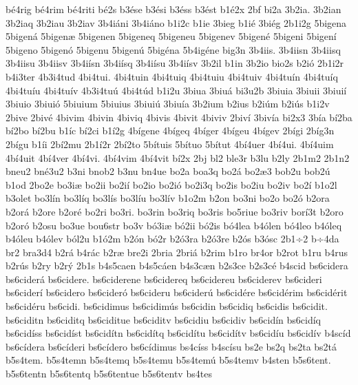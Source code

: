 {b^^e94rig
b^^e94rim
b^^e94riti
b^^e92s
b3^^e9se
b3^^e9si
b3^^e9ss
b3^^e9st
b1^^e92x
2bf
bi2a
3b2ia.
3b2ian
3b2iaq
3b2iau
3b2iav
3b4i^^e1ni
3b4i^^e1no
b1i2c
b1ie
3bieg
b1i^^e9
3bi^^e9g
2b1i2g
5bigena
5bigen^^e1
5bigen^^e6
5bigenen
5bigeneq
5bigeneu
5bigenev
5bigen^^e9
5bigeni
5bigen^^ed
5bigeno
5bigen^^f3
5bigenu
5bigen^^fa
5big^^e9na
5b4ig^^e9ne
big3n
3b4iis.
3b4iisn
3b4iisq
3b4iisu
3b4iisv
3b4i^^edsn
3b4i^^edsq
3b4i^^edsu
3b4i^^edsv
3b2il
b1in
3b2io
bio2s
b2i^^f3
2b1i2r
b4i3ter
4b3i4tud
4bi4tui.
4bi4tuin
4bi4tuiq
4bi4tuiu
4bi4tuiv
4bi4tu^^edn
4bi4tu^^edq
4bi4tu^^edu
4bi4tu^^edv
4b3i4tu^^fa
4bi4t^^fad
b1i2u
3biua
3biu^^e1
bi3u2b
3biuia
3biuii
3biui^^ed
3biuio
3biui^^f3
5biuium
5biuius
3biui^^fa
3biu^^eda
3b2ium
b2ius
b2i^^fam
b2i^^fas
b1i2v
2bive
2biv^^e9
4bivim
4bivin
4biviq
4bivis
4bivit
4biviv
2biv^^ed
3biv^^eda
bi2x3
3b^^eda
b^^ed2ba
b^^ed2bo
b^^ed2bu
b1^^edc
b^^ed2ci
b1^^ed2g
4b^^edgene
4b^^edgeq
4b^^edger
4b^^edgeu
4b^^edgev
2b^^edgi
2b^^edg3n
2b^^edgu
b1^^edi
2b^^ed2mu
2b1^^ed2r
2b^^ed2to
5b^^edtuis
5b^^edtuo
5b^^edtut
4b^^ed4uer
4b^^ed4ui.
4b^^ed4uim
4b^^ed4uit
4b^^ed4ver
4b^^ed4vi.
4b^^ed4vim
4b^^ed4vit
b^^ed2x
2bj
bl2
ble3r
b3lu
b2ly
2b1m2
2b1n2
bneu2
bn^^e93u2
b3ni
bnob2
b3nu
bn4ue
bo2a
boa3q
bo2^^e1
bo2^^e63
bob2u
bob2^^fa
b1od
2bo2e
bo3i^^e6
bo2ii
bo2i^^ed
bo2io
bo2i^^f3
bo2i3q
bo2is
bo2iu
bo2iv
bo2^^ed
b1o2l
b3olet
bo3l^^edn
bo3l^^edq
bo3l^^eds
bo3l^^edu
bo3l^^edv
b1o2m
b2on
bo3ni
bo2o
bo2^^f3
b2ora
b2or^^e1
b2ore
b2or^^e9
bo2ri
bo3ri.
bo3rin
bo3riq
bo3ris
bo5riue
bo3riv
bor^^ed3t
b2oro
b2or^^f3
b2osu
bo3ue
bou6str
bo3v
b^^f33i^^e6
b^^f32ii
b^^f32is
b^^f34lea
b4^^f3len
b^^f34leo
b4^^f3leq
b4^^f3leu
b4^^f3lev
b^^f3l2u
b1^^f32m
b2^^f3n
b^^f32r
b2^^f33ra
b2^^f33re
b2^^f3s
b3^^f3sc
2b1^^f72
b^^f74da
br2
bra3d4
b2r^^e1
b4r^^e1c
b2r^^e6
bre2i
2bria
2bri^^e1
b2rim
b1ro
br4or
b2rot
b1ru
b4rus
b2r^^fas
b2ry
b2r^^fd
2b1s
b4s5caen
b4s5c^^e1en
b4s3c^^e6n
b2s3ce
b2s3c^^e9
b4scid
bs6cidera
bs6cider^^e1
bs6cidere.
bs6ciderene
bs6cidereq
bs6cidereu
bs6ciderev
bs6cideri
bs6cider^^ed
bs6cidero
bs6cider^^f3
bs6cideru
bs6cider^^fa
bs6cid^^e9re
bs6cid^^e9rim
bs6cid^^e9rit
bs6cid^^e9ru
bs6cidi.
bs6cidimus
bs6cidim^^fas
bs6cidin
bs6cidiq
bs6cidis
bs6cidit.
bs6ciditn
bs6ciditq
bs6ciditue
bs6ciditv
bs6cidiu
bs6cidiv
bs6cid^^edn
bs6cid^^edq
bs6cid^^edss
bs6cid^^edst
bs6cid^^edtn
bs6cid^^edtq
bs6cid^^edtu
bs6cid^^edtv
bs6cid^^edu
bs6cid^^edv
b4sc^^edd
bs6c^^eddera
bs6c^^edderi
bs6c^^eddero
bs6c^^eddimus
bs4c^^edss
b4sc^^edsu
bs2e
bs2q
bs2ta
bs2t^^e1
b5s4tem.
b5s4temn
b5s4temq
b5s4temu
b5s4tem^^fa
b5s4temv
b4sten
b5s6tent.
b5s6tentn
b5s6tentq
b5s6tentue
b5s6tentv
bs4tes
}
